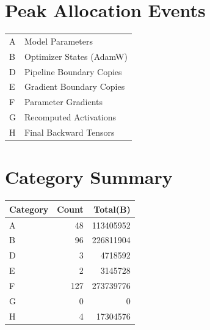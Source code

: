 \documentclass{article}
\begin{document}
\section*{Peak Allocation Events}
\small
\begin{tabular}{ll}
A & Model Parameters \\
B & Optimizer States (AdamW) \\
D & Pipeline Boundary Copies \\
E & Gradient Boundary Copies \\
F & Parameter Gradients \\
G & Recomputed Activations \\
H & Final Backward Tensors \\
\end{tabular}
\vspace{0.5em}
\section*{Category Summary}
\begin{tabular}{l r r}
Category & Count & Total(B) \\
\hline
A & 48 & 113405952 \\
B & 96 & 226811904 \\
D & 3 & 4718592 \\
E & 2 & 3145728 \\
F & 127 & 273739776 \\
G & 0 & 0 \\
H & 4 & 17304576 \\
\end{tabular}
\vspace{0.5em}
\end{document}
